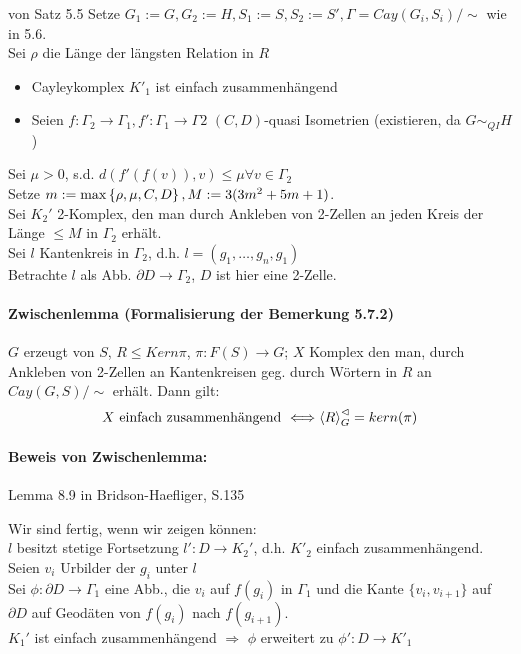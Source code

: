 \documentclass{article}
\begin{document}
\begin{Beweis}{von Satz 5.5}
Setze $G_1 := G, G_2 := H, S_1 := S, S_2 := S', \Gamma = Cay(G_i, S_i)/\sim$ wie in 5.6.\\

Sei $\rho$ die Länge der längsten Relation in $R$
\begin{itemize}
	\item Cayleykomplex $K'_1$ ist einfach zusammenhängend
	\item Seien $f:\Gamma_2 \rightarrow \Gamma_1, f' : \Gamma_1 \rightarrow \Gamma 2$ $(C,D)$-quasi Isometrien (existieren, da $G \sim_{QI} H$)
\end{itemize}
Sei $\mu > 0$, s.d. $d(f'(f(v)), v) \leq \mu \forall v \in \Gamma_2$\\
Setze $m:= \max \set{\rho, \mu, C,D}{}, M := 3(3m^2 + 5m + 1)$.\\
Sei $K_2'$ 2-Komplex, den man durch Ankleben von 2-Zellen an jeden Kreis der Länge $\leq M$ in $\Gamma_2$ erhält.\\

Sei $l$ Kantenkreis in $\Gamma_2$, d.h. $l = (g_1,\ldots, g_n, g_1)$\\
Betrachte $l$ als Abb. $\partial D \rightarrow \Gamma_2$, $D$ ist hier eine 2-Zelle.\\

\paragraph{Zwischenlemma (Formalisierung der Bemerkung 5.7.2)}
$G$ erzeugt von $S$, $R \leq Kern \pi$, $\pi : F(S) \rightarrow G$; $X$ Komplex den man, durch Ankleben von 2-Zellen an Kantenkreisen geg. durch Wörtern in $R$ an $Cay(G,S)/\sim$ erhält. Dann gilt:
\[X \text{ einfach zusammenhängend } \Longleftrightarrow \grp{R}{}_G^\vartriangleleft = kern(\pi)  \]
\paragraph{Beweis von Zwischenlemma:} Lemma 8.9 in Bridson-Haefliger, S.135


Wir sind fertig, wenn wir zeigen können:\\
$l$ besitzt stetige Fortsetzung $l' : D \rightarrow K_2'$, d.h. $K'_2$ einfach zusammenhängend.\\
Seien $v_i$ Urbilder der $g_i$ unter $l$\\
Sei $\phi : \partial D \rightarrow \Gamma_1$ eine Abb., die $v_i$ auf $f(g_i)$ in $\Gamma_1$ und die Kante $\{v_i, v_{i+1}\}$ auf $\partial D$ auf Geodäten von $f(g_i)$ nach $f(g_{i+1})$.\\
$K_1'$ ist einfach zusammenhängend $\Longrightarrow$ $\phi$ erweitert zu $\phi': D \rightarrow K'_1$


\end{Beweis}
\end{document}
